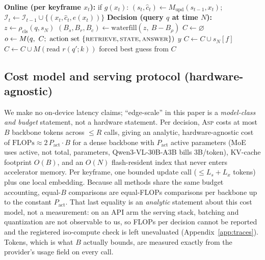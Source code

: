 \documentclass[10pt]{article}
\theoremstyle{definition}
\theoremstyle{plain}
\newcommand{\ASP}{\textsc{Asp}}
\begin{document}
\begin{algorithm}[t]
\caption{\ASP{} per-decision procedure (per-decision budget $B$, rounds $R$, retrieval size $k$)}
\label{alg:asp}
\begin{algorithmic}[1]
\Statex \textbf{Online (per keyframe $x_t$):} if $g(x_t)$: $(s_t,\hat c_t)\gets M_{\mathrm{upd}}(s_{t-1},x_t)$;\ \ $\mathcal{I}_t\gets\mathcal{I}_{t-1}\cup\{(x_t,\hat c_t,e(x_t))\}$
\Statex \textbf{Decision (query $q$ at time $N$):}
\State $z\gets\rho_{\mathrm{cls}}(q,s_N)$ 
\State $(B_s,B_r,B_c)\gets\mathrm{waterfill}(z,\ B-B_\rho)$ 
\State $C\gets\varnothing$
  \State $o\gets M(q,\ C;\ \text{action set }\{\textsc{retrieve},\textsc{state},\textsc{answer}\})$ 
   \Return $y$
   $C\gets C\cup s_N[f]$ 
   $C\gets C\cup M(\text{read } r(q';k))$ 
  \EndIf
\EndFor
\State \Return forced best guess from $C$ 
\end{algorithmic}
\end{algorithm}

\subsection{Cost model and serving protocol (hardware-agnostic)}
\label{sec:cost}
We make no on-device latency claims; ``edge-scale'' in this paper is a \emph{model-class and budget} statement, not a hardware statement. Per decision, \ASP{} costs at most $B$ backbone tokens across $\le R$ calls, giving an analytic, hardware-agnostic cost of $\mathrm{FLOPs}\approx 2\,P_{\mathrm{act}}\cdot B$ for a dense backbone with $P_{\mathrm{act}}$ active parameters (MoE uses active, not total, parameters, Qwen3-VL-30B-A3B bills 3B/token), KV-cache footprint $O(B)$, and an $O(N)$ flash-resident index that never enters accelerator memory. Per keyframe, one bounded update call ($\le L_s{+}L_x$ tokens) plus one local embedding. Because all methods share the same budget accounting, equal-$B$ comparisons are equal-FLOPs comparisons per backbone up to the constant $P_{\mathrm{act}}$. That last equality is an \emph{analytic} statement about this cost model, not a measurement: on an API arm the serving stack, batching and quantization are not observable to us, so FLOPs per decision cannot be reported and the registered iso-compute check is left unevaluated (Appendix~\ref{app:traces}). Tokens, which is what $B$ actually bounds, are measured exactly from the provider's usage field on every call.
\end{document}
